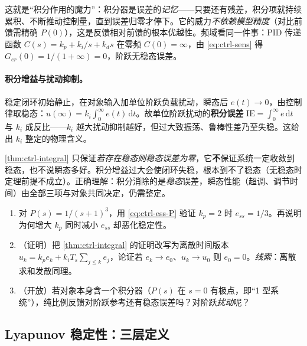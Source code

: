 \begin{insight}
这就是“积分作用的魔力”：积分器是误差的\emph{记忆}——只要还有残差，积分项就持续累积、不断推动控制量，直到误差归零才停下。它的威力\emph{不依赖模型精度}（对比前馈需精确 $P(0)$），这是反馈相对前馈的根本优越性。频域看同一件事：PID 传递函数 $C(s)=k_p+k_i/s+k_ds$ 在零频 $C(0)=\infty$，由 \cref{eq:ctrl-sens} 得 $G_{er}(0)=1/(1+\infty)=0$，阶跃无稳态误差。
\end{insight}

\paragraph{积分增益与扰动抑制。}
稳定闭环初始静止，在对象输入加单位阶跃负载扰动，瞬态后 $e(t)\to0$，由控制律取稳态\cite{astrom2008feedback}：$u(\infty)=k_i\int_0^\infty e(t)\,\mathrm dt$。故单位阶跃扰动的\textbf{积分误差} $\mathrm{IE}=\int_0^\infty e\,\mathrm dt$ 与 $k_i$ 成反比——$k_i$ 越大扰动抑制越好，但过大致振荡、鲁棒性差乃至失稳。这给出 $k_i$ 整定的物理含义。

\begin{pitfall}
\cref{thm:ctrl-integral} 只保证\emph{若存在稳态则稳态误差为零}，它\textbf{不}保证系统一定收敛到稳态，也不说瞬态多好。积分增益过大会使闭环失稳，根本到不了稳态（无稳态时定理前提不成立）。正确理解：积分消除的是\emph{稳态}误差，瞬态性能（超调、调节时间）由全部三项与对象共同决定，仍需整定。
\end{pitfall}

\begin{practice}
\begin{enumerate}
  \item 对 $P(s)=1/(s+1)^3$，用 \cref{eq:ctrl-ess-P} 验证 $k_p=2$ 时 $e_{ss}=1/3$。再说明为何增大 $k_p$ 同时减小 $e_{ss}$ 却恶化稳定性。
  \item （证明）把 \cref{thm:ctrl-integral} 的证明改写为离散时间版本 $u_k=k_pe_k+k_iT_s\sum_{j\le k}e_j$，论证若 $e_k\to e_0$、$u_k\to u_0$ 则 $e_0=0$。\emph{线索}：离散求和发散同理。
  \item （开放）若对象本身含一个积分器（$P(s)$ 在 $s=0$ 有极点，即“1 型系统”），纯比例反馈对阶跃参考还有稳态误差吗？对阶跃\emph{扰动}呢？
\end{enumerate}
\end{practice}

\subsection{Lyapunov 稳定性：三层定义}
\label{sec:ctrl-lyapunov}

